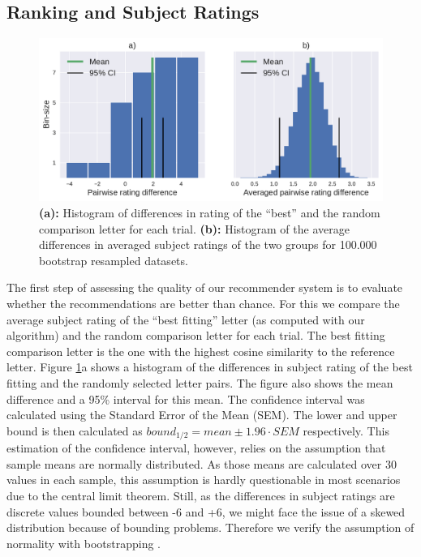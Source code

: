 \subsection*{Ranking and Subject Ratings}
\begin{figure}[t]
	\includegraphics[width=\textwidth]{figures/both_diff_tf}
	\caption{\textbf{(a):} Histogram of differences in rating of the ``best'' and the random comparison letter for each trial.
		\textbf{(b):} Histogram of the average differences in averaged subject ratings of the two groups for 100.000 bootstrap resampled datasets.}
	\label{fig:both_diff_tf}
\end{figure}
The first step of assessing the quality of our recommender system is to evaluate whether the recommendations are better than chance. For this we compare the average subject rating of the ``best fitting'' letter (as computed with our algorithm) and the random comparison letter for each trial. The best fitting comparison letter is the one with the highest cosine similarity to the reference letter.
Figure \ref{fig:both_diff_tf}a shows a histogram of the differences in subject rating of the best fitting and the randomly selected letter pairs. The figure also shows the mean difference and a 95\% interval for this mean. The confidence interval was calculated using the Standard Error of the Mean (SEM). The lower and upper bound is then calculated as $bound_{1/2} = mean \pm 1.96 \cdot SEM$ respectively. This estimation of the confidence interval, however, relies on the assumption that sample means are normally distributed. As those means are calculated over 30 values in each sample, this assumption is hardly questionable in most scenarios due to the central limit theorem. Still, as the differences in subject ratings are discrete values bounded between -6 and +6, we might face the issue of a skewed distribution because of bounding problems. Therefore we verify the assumption of normality with bootstrapping \citep{Efron1979}.

